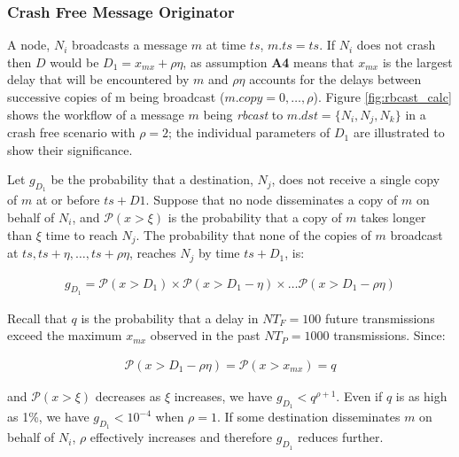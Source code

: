         \subsubsection*{Crash Free Message Originator}
        A node, $N_i$ broadcasts a message $m$ at time $ts$, $m.ts = ts$.  If $N_i$ does not crash then $D$ would be $D_1 = x_{mx} + \rho\eta$, as assumption \textbf{A4} means that $x_{mx}$ is the largest delay that will be encountered by $m$ and $\rho\eta$ accounts for the delays between successive copies of m being broadcast ($m.copy = 0,\ldots,\rho$).  Figure \ref{fig:rbcast_calc} shows the workflow of a message $m$ being \emph{rbcast} to $m.dst = \{N_i, N_j, N_k\}$ in a crash free scenario with $\rho = 2$; the individual parameters of $D_1$ are illustrated to show their significance.  
        
        Let $g_{D_1}$ be the probability that a destination, $N_j$, does not receive a single copy of $m$ at or before $ts + D1$.  Suppose that no node disseminates a copy of $m$ on behalf of $N_i$, and $\mathcal{P}(x > \xi)$ is the probability that a copy of $m$ takes longer than $\xi$ time to reach $N_{j}$.  The probability that none of the copies of $m$ broadcast at $ts, ts+\eta, \ldots,  ts+\rho \eta$, reaches $N_{j}$ by time $ts+D_1$, is:
        
        \begin{equation*}
            \begin{aligned}
                g_{D_1}= \mathcal{P}(x > D_1) \times \mathcal{P}(x > D_1 - \eta) \times \ldots \mathcal{P}(x > D_1 - \rho \eta)
            \end{aligned}
        \end{equation*}

        
        Recall that $q$ is the probability that a delay in $NT_F=100$ future transmissions exceed the maximum $x_{mx}$ observed in the past $NT_P=1000$ transmissions. Since:
        
        \begin{equation*}
            \begin{aligned}
                \mathcal{P}(x > D_1 - \rho \eta) = \mathcal{P}(x > x_{mx}) = q
            \end{aligned}
        \end{equation*}
        
and $\mathcal{P}(x > \xi)$ decreases as $\xi$ increases, we have $g_{D_1} < q^{\rho+1}$.  Even if $q$ is as high as 1\%, we have $g_{D_1} < 10^{-4}$ when $\rho=1$. If some destination disseminates $m$ on behalf of $N_i$, $\rho$ effectively increases and therefore $g_{D_1}$ reduces further.

